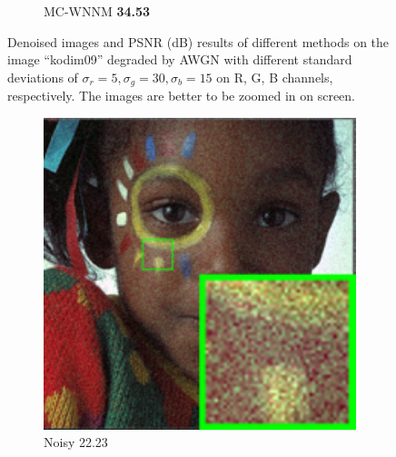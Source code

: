 \begin{figure}
\begin{subfigure}[t]{0.19\textwidth}
		\caption{MC-WNNM \textbf{34.53}}
    \end{subfigure}
    \caption{Denoised images and PSNR (dB) results of different methods on the image ``kodim09'' degraded by AWGN with different standard deviations of $\sigma_{r}=5, \sigma_{g}=30, \sigma_{b}=15$ on R, G, B channels, respectively. The images are better to be zoomed in on screen.}
    \label{fig4-7}
\end{figure}


\begin{figure}
    \centering
    \begin{subfigure}[t]{0.19\textwidth}
        \centering
        \includegraphics[width=1\textwidth]{images/mcwnnm/24images/resize_br_Noisy_nSig53015_kodim15.png}
		\caption{Noisy 22.23}
    \end{subfigure}
    \hfill
    \begin{subfigure}[t]{0.19\textwidth}
        \centering

\end{subfigure}
\end{figure}
